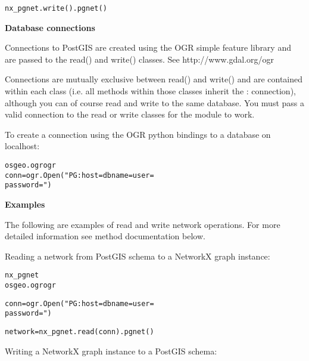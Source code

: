 \begin{alltt}
\pysrcprompt{{\textgreater}{\textgreater}{\textgreater} }nx\_pgnet.write().pgnet()
\pysrcprompt{{\textgreater}{\textgreater}{\textgreater} }\end{alltt}
\textbf{Database connections}

Connections to PostGIS are created using the OGR simple feature library and
are passed to the read() and write() classes. See http://www.gdal.org/ogr

Connections are mutually exclusive between read() and write() and are 
contained within each class (i.e. all methods within those classes inherit 
the : connection), although you can of course read and write to the same 
database. You must pass a valid connection to the read or write classes for
the module to work.

To create a connection using the OGR python bindings to a database on 
localhost:

\begin{alltt}
\pysrcprompt{{\textgreater}{\textgreater}{\textgreater} } osgeo.ogr  ogr
\pysrcprompt{{\textgreater}{\textgreater}{\textgreater} }conn = ogr.Open("PG: host= dbname= user=
\pysrcprompt{{\textgreater}{\textgreater}{\textgreater} }                password=")\end{alltt}
\textbf{Examples}

The following are examples of read and write network operations. For more 
detailed information see method documentation below.

Reading a network from PostGIS schema to a NetworkX graph instance:

\begin{alltt}
\pysrcprompt{{\textgreater}{\textgreater}{\textgreater} } nx\_pgnet
\pysrcprompt{{\textgreater}{\textgreater}{\textgreater} } osgeo.ogr  ogr\end{alltt}
\begin{alltt}
\pysrcprompt{{\textgreater}{\textgreater}{\textgreater} }
\pysrcprompt{{\textgreater}{\textgreater}{\textgreater} }conn = ogr.Open("PG: host= dbname= user=
\pysrcprompt{{\textgreater}{\textgreater}{\textgreater} }                password=")\end{alltt}
\begin{alltt}
\pysrcprompt{{\textgreater}{\textgreater}{\textgreater} }
\pysrcprompt{{\textgreater}{\textgreater}{\textgreater} }
\pysrcprompt{{\textgreater}{\textgreater}{\textgreater} }network = nx\_pgnet.read(conn).pgnet()\end{alltt}
Writing a NetworkX graph instance to a PostGIS schema:

